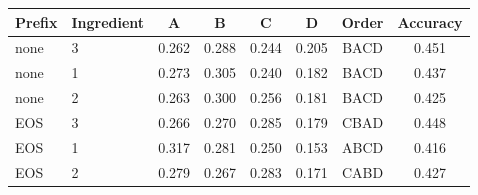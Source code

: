 \begin{tabular}{llcccccc}
\toprule
Prefix & Ingredient & A & B & C & D & Order & Accuracy \\
\midrule
none & 3 & 0.262 & 0.288 & 0.244 & 0.205 & BACD & 0.451 \\
none & 1 & 0.273 & 0.305 & 0.240 & 0.182 & BACD & 0.437 \\
none & 2 & 0.263 & 0.300 & 0.256 & 0.181 & BACD & 0.425 \\
EOS & 3 & 0.266 & 0.270 & 0.285 & 0.179 & CBAD & 0.448 \\
EOS & 1 & 0.317 & 0.281 & 0.250 & 0.153 & ABCD & 0.416 \\
EOS & 2 & 0.279 & 0.267 & 0.283 & 0.171 & CABD & 0.427 \\
\bottomrule
\end{tabular}
